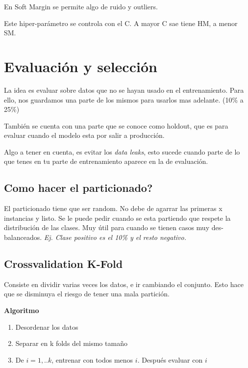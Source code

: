 \documentclass[titlepage,a4paper]{article}
\begin{document}
En Soft Margin se permite algo de ruido y outliers.

Este hiper-parámetro se controla con el C. A mayor C sae tiene HM, a menor SM.



\section{Evaluación y selección}

La idea es evaluar sobre datos que no se hayan usado en el entrenamiento. Para ello, nos guardamos una parte de los mismos para usarlos mas adelante. (10\% a 25\%)

También se cuenta con una parte que se conoce como holdout, que es para evaluar cuando el modelo esta por salir a producción.

Algo a tener en cuenta, es evitar los \textit{data leaks}, esto sucede cuando parte de lo que tenes en tu parte de entrenamiento aparece en la de evaluación.

\subsection{Como hacer el particionado?}

El particionado tiene que ser random. No debe de agarrar las primeras x instancias y listo. Se le puede pedir cuando se esta partiendo que respete la distribución de las clases. Muy útil para cuando se tienen casos muy des-balanceados. \textit{Ej. Clase positivo es el 10\% y el resto negativo.}


\subsection{Crossvalidation K-Fold}

Consiste en dividir varias veces los datos, e ir cambiando el conjunto. Esto hace que se disminuya el riesgo de tener una mala partición.

\textbf{Algoritmo}
\begin{enumerate}
    \item Desordenar los datos
    \item Separar en k folds del mismo tamaño
    \item De $i = 1,..k$, entrenar con todos menos $i$. Después evaluar con $i$  
\end{enumerate}
\end{document}
